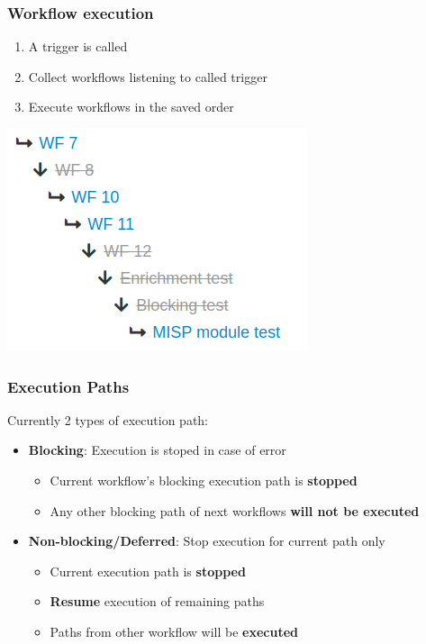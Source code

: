 \begin{frame}
    \frametitle{Workflow execution}
    \begin{enumerate}
        \item A trigger is called
        \item Collect workflows listening to called trigger
        \item Execute workflows in the saved order
    \end{enumerate}
    \begin{center}
        \includegraphics[width=0.5\linewidth]{pictures/execution-order-1.png}
    \end{center}
\end{frame}

\begin{frame}
    \frametitle{Execution Paths}
    Currently 2 types of execution path:
    \vspace{0.5em}
    \begin{itemize}
        \item {\bf Blocking}: Execution is stoped in case of error
        \begin{itemize}
            \item Current workflow's blocking execution path is {\bf stopped}
            \item Any other blocking path of next workflows {\bf will not be executed}
        \end{itemize}
        \vspace{0.5em}
        \item {\bf Non-blocking/Deferred}: Stop execution for current path only
        \begin{itemize}
            \item Current execution path is {\bf stopped}
            \item {\bf Resume} execution of remaining paths
            \item Paths from other workflow will be {\bf executed}
        \end{itemize}
    \end{itemize}
\end{frame}

